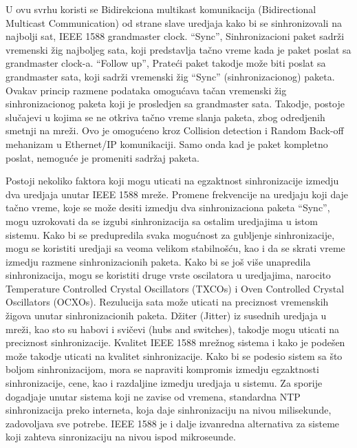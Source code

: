 \documentclass[a4paper,12pt, master]{etf}
\begin{document}
	U ovu svrhu koristi se Bidirekciona multikast komunikacija (Bidirectional
	Multicast Communication) od strane slave uredjaja kako bi se sinhronizovali
	na najbolji sat, IEEE 1588 grandmaster clock. ``Sync'', Sinhronizacioni
	paket sadr\v{z}i vremenski \v{z}ig najboljeg sata, koji predstavlja
	ta\v{c}no vreme kada je paket poslat sa grandmaster clock-a. ``Follow up'',
	Prate\'{c}i paket takodje mo\v{z}e biti poslat sa grandmaster sata, koji
	sadr\v{z}i vremenski \v{z}ig ``Sync'' (sinhronizacionog) paketa. Ovakav
	princip razmene podataka omogu\'{c}ava ta\v{c}an vremenski \v{z}ig
	sinhronizacionog paketa koji je prosledjen sa grandmaster sata. Takodje,
	postoje	slu\v{c}ajevi u kojima se ne otkriva ta\v{c}no vreme slanja paketa,
	zbog odredjenih smetnji na mre\v{z}i. Ovo je omogu\'{c}eno kroz Collision
	detection i Random Back-off	mehanizam u Ethernet/IP komunikaciji. Samo onda
	kad je paket kompletno poslat, nemogu\'{c}e	je promeniti sadr\v{z}aj paketa.

	Postoji nekoliko faktora koji mogu uticati na egzaktnost sinhronizacije
	izmedju dva	uredjaja unutar IEEE 1588 mre\v{z}e. Promene frekvencije na
	uredjaju koji daje ta\v{c}no vreme,	koje se mo\v{z}e desiti izmedju dva
	sinhronizaciona paketa ``Sync'', mogu uzrokovati da se izgubi
	sinhronizacija sa ostalim uredjajima u istom sistemu. Kako bi se
	predupredila svaka mogu\'{c}nost za gubljenje sinhronizacije, mogu se
	koristiti uredjaji sa veoma velikom	stabilno\v{s}\'{c}u, kao i da se skrati
	vreme izmedju razmene sinhronizacionih paketa. Kako bi se jo\v{s} vi\v{s}e
	unapredila sinhronizacija, mogu se koristiti druge vrste oscilatora u
	uredjajima, narocito Temperature Controlled Crystal Oscillators (TXCOs) i
	Oven Controlled Crystal	Oscillators (OCXOs). Rezulucija sata mo\v{z}e
	uticati na preciznost vremenskih \v{z}igova unutar sinhronizacionih paketa.
	D\v{z}iter (Jitter) iz susednih uredjaja u mre\v{z}i, kao sto su habovi i
	svi\v{c}evi (hubs and switches), takodje mogu uticati na preciznost
	sinhronizacije. Kvalitet IEEE 1588 mre\v{z}nog sistema i kako je
	pode\v{s}en mo\v{z}e takodje uticati na kvalitet sinhronizacije. Kako bi
	se podesio sistem sa \v{s}to boljom sinhronizacijom, mora se napraviti
	kompromis izmedju egzaktnosti sinhronizacije, cene, kao i razdaljine
	izmedju uredjaja u sistemu. Za sporije dogadjaje unutar sistema koji ne
	zavise od vremena, standardna NTP sinhronizacija preko interneta, koja daje
	sinhronizaciju na nivou milisekunde, zadovoljava sve potrebe. IEEE 1588 je
	i dalje izvanredna alternativa za sisteme koji zahteva sinronizaciju na
	nivou ispod	mikroseunde.
\end{document}
